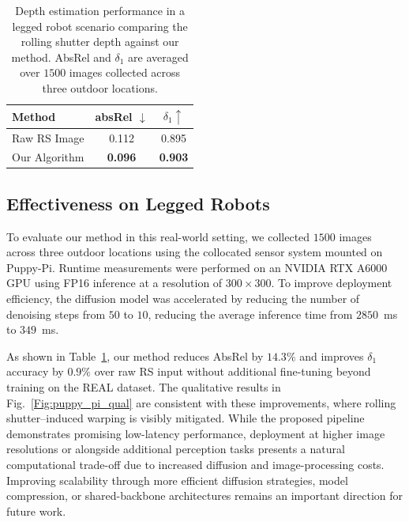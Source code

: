 \begin{table}[t!]
    \centering
    \caption{Depth estimation performance in a legged robot scenario comparing the rolling shutter depth against our method. AbsRel and $\delta_1$ are averaged over $1500$ images collected across three outdoor locations.}
    \setlength{\tabcolsep}{12pt}
    \renewcommand{\arraystretch}{1.2}
    \begin{tabular}{lcc}
        \toprule
        Method & absRel $\downarrow$ & $\delta_1 \uparrow$ \\
        \midrule
        Raw RS Image & 0.112 & 0.895 \\
        Our Algorithm & \textbf{0.096} & \textbf{0.903} \\
        \bottomrule
    \end{tabular}

    \label{tab:puppy_pi}
\end{table}




\subsection{Effectiveness on Legged Robots}


To evaluate our method in this real-world setting, we collected $1500$ images across three outdoor locations using the collocated sensor system mounted on Puppy-Pi. Runtime measurements were performed on an NVIDIA RTX A6000 GPU using FP16 inference at a resolution of $300\times300$. To improve deployment efficiency, the diffusion model was accelerated by reducing the number of denoising steps from $50$ to $10$, reducing the average inference time from $2850$~ms to $349$~ms.

As shown in Table~\ref{tab:puppy_pi}, our method reduces AbsRel by $14.3\%$ and improves $\delta_1$ accuracy by $0.9\%$ over raw RS input without additional fine-tuning beyond training on the REAL dataset. The qualitative results in Fig.~\ref{Fig:puppy_pi_qual} are consistent with these improvements, where rolling shutter--induced warping is visibly mitigated. While the proposed pipeline demonstrates promising low-latency performance, deployment at higher image resolutions or alongside additional perception tasks presents a natural computational trade-off due to increased diffusion and image-processing costs. Improving scalability through more efficient diffusion strategies, model compression, or shared-backbone architectures remains an important direction for future work.


